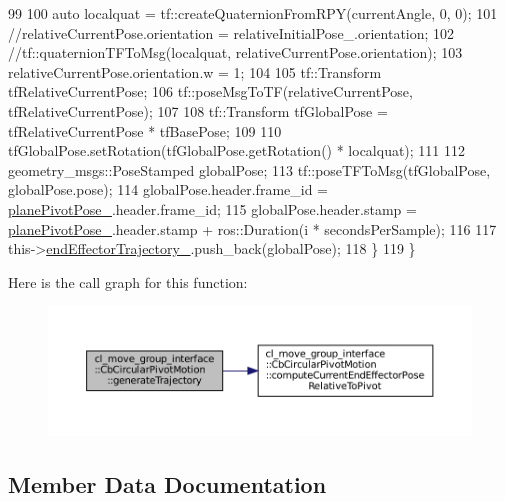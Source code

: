\begin{DoxyCode}
99 
100             \textcolor{keyword}{auto} localquat = tf::createQuaternionFromRPY(currentAngle, 0, 0);
101             \textcolor{comment}{//relativeCurrentPose.orientation = relativeInitialPose\_.orientation;}
102             \textcolor{comment}{//tf::quaternionTFToMsg(localquat, relativeCurrentPose.orientation);}
103             relativeCurrentPose.orientation.w = 1;
104 
105             tf::Transform tfRelativeCurrentPose;
106             tf::poseMsgToTF(relativeCurrentPose, tfRelativeCurrentPose);
107 
108             tf::Transform tfGlobalPose = tfRelativeCurrentPose * tfBasePose;
109 
110             tfGlobalPose.setRotation(tfGlobalPose.getRotation() * localquat);
111 
112             geometry\_msgs::PoseStamped globalPose;
113             tf::poseTFToMsg(tfGlobalPose, globalPose.pose);
114             globalPose.header.frame\_id = \hyperlink{classcl__move__group__interface_1_1CbCircularPivotMotion_a0994efbe93b9f9a61fcf3703c360cda2}{planePivotPose\_}.header.frame\_id;
115             globalPose.header.stamp = \hyperlink{classcl__move__group__interface_1_1CbCircularPivotMotion_a0994efbe93b9f9a61fcf3703c360cda2}{planePivotPose\_}.header.stamp + ros::Duration(i * 
      secondsPerSample);
116 
117             this->\hyperlink{classcl__move__group__interface_1_1CbMoveEndEffectorTrajectory_ae13dfd31ea3660646e03882f0c2c29f0}{endEffectorTrajectory\_}.push\_back(globalPose);
118         \}
119     \}
\end{DoxyCode}
Here is the call graph for this function\+:
\nopagebreak
\begin{figure}[H]
\begin{center}
\leavevmode
\includegraphics[width=350pt]{classcl__move__group__interface_1_1CbCircularPivotMotion_a8d019ec6b9b26a2af0740b915d441a40_cgraph}
\end{center}
\end{figure}


\subsection{Member Data Documentation}
\mbox{\label{classcl__move__group__interface_1_1CbCircularPivotMotion_a39fa383804d82285e07fa1c5a37cc587}} 
